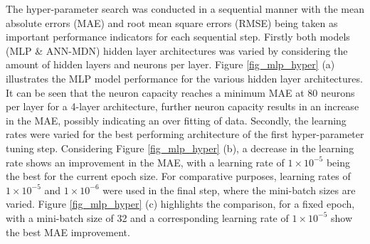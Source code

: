 \documentclass[a4paper,fleqn]{cas-dc}
\begin{document}
The hyper-parameter search was conducted in a sequential manner with the mean absolute errors (MAE) and root mean square errors (RMSE) being taken as important performance indicators for each sequential step. Firstly both models (MLP \& ANN-MDN) hidden layer architectures was varied by considering the amount of hidden layers and neurons per layer. Figure \ref{fig_mlp_hyper} (a) illustrates the MLP model performance for the various hidden layer architectures. It can be seen that the neuron capacity reaches a minimum MAE at 80 neurons per layer for a 4-layer architecture, further neuron capacity results in an increase in the MAE, possibly indicating an over fitting of data. Secondly, the learning rates were varied for the best performing architecture of the first hyper-parameter tuning step. Considering Figure \ref{fig_mlp_hyper} (b), a decrease in the learning rate shows an improvement in the MAE, with a learning rate of $1\times10^{-5}$ being the best for the current epoch size. For comparative purposes, learning rates of $1\times10^{-5}$ and $1\times10^{-6}$ were used in the final step, where the mini-batch sizes are varied. Figure \ref{fig_mlp_hyper} (c) highlights the comparison, for a fixed epoch, with a mini-batch size of 32 and a corresponding learning rate of $1\times10^{-5}$ show the best MAE improvement.\\
\end{document}
